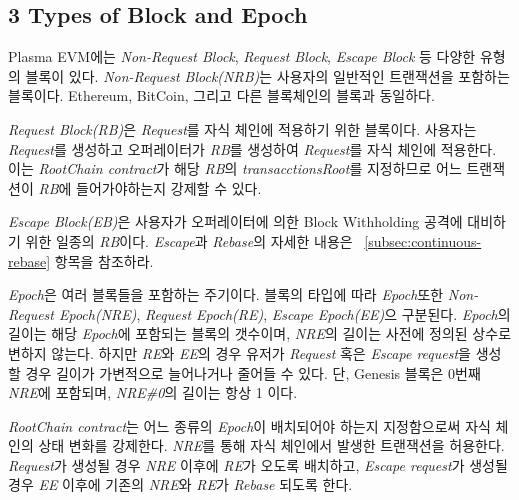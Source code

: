 \documentclass[letterpaper, 11pt]{article}
\begin{document}
\subsection{3 Types of Block and Epoch}
\begin{CJK}{UTF8}{mj}
Plasma EVM에는 \emph{Non-Request Block}, \emph{Request Block}, \emph{Escape Block} 등 다양한 유형의 블록이 있다. \emph{Non-Request Block(NRB)}는 사용자의 일반적인 트랜잭션을 포함하는 블록이다. Ethereum, BitCoin, 그리고 다른 블록체인의 블록과 동일하다.

\emph{Request Block(RB)}은 \emph{Request}를 자식 체인에 적용하기 위한 블록이다. 사용자는 \emph{Request}를 생성하고 오퍼레이터가 \emph{RB}를 생성하여 \emph{Request}를 자식 체인에 적용한다. 이는 \emph{RootChain contract}가 해당 \emph{RB}의 \emph{transacctionsRoot}를 지정하므로 어느 트랜잭션이 \emph{RB}에 들어가야하는지 강제할 수 있다.

\emph{Escape Block(EB)}은 사용자가 오퍼레이터에 의한 Block Withholding 공격에 대비하기 위한 일종의 \emph{RB}이다. \emph{Escape}과 \emph{Rebase}의 자세한 내용은 ~\ref{subsec:continuous-rebase} 항목을 참조하라.

\bigskip

\emph{Epoch}은 여러 블록들을 포함하는 주기이다. 블록의 타입에 따라 \emph{Epoch}또한 \emph{Non-Request Epoch(NRE)}, \emph{Request Epoch(RE)}, \emph{Escape Epoch(EE)}으 구분된다. \emph{Epoch}의 길이는 해당 \emph{Epoch}에 포함되는 블록의 갯수이며, \emph{NRE}의 길이는 사전에 정의된 상수로 변하지 않는다. 하지만 \emph{RE}와 \emph{EE}의 경우 유저가 \emph{Request} 혹은 \emph{Escape request}을 생성할 경우 길이가 가변적으로 늘어나거나 줄어들 수 있다. 단, Genesis 블록은 0번째 \emph{NRE}에 포함되며, \emph{NRE\#0}의 길이는 항상 1 이다.

\emph{RootChain contract}는 어느 종류의 \emph{Epoch}이 배치되어야 하는지 지정함으로써 자식 체인의 상태 변화를 강제한다. \emph{NRE}를 통해 자식 체인에서 발생한 트랜잭션을 허용한다. \emph{Request}가 생성될 경우 \emph{NRE} 이후에 \emph{RE}가 오도록 배치하고, \emph{Escape request}가 생성될 경우 \emph{EE} 이후에 기존의 \emph{NRE}와 \emph{RE}가 \emph{Rebase} 되도록 한다.

\end{CJK}
\end{document}
